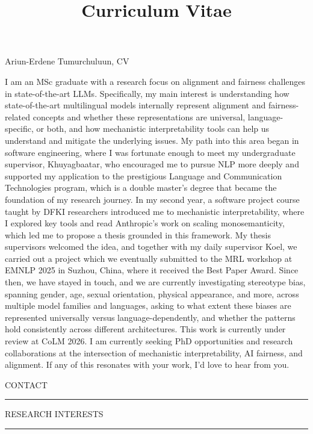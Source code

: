 \documentclass[11pt,a4paper,roman]{moderncv}
\title{Curriculum Vitae}
\newcommand{\cvsection}[1]{%
  \vspace{0.8em}%
  {\large\MakeUppercase{#1}}\\[-0.35em]%
  \rule{\textwidth}{0.4pt}\vspace{0.25em}%
}
\begin{document}
\begin{center}
{\Huge{Ariun-Erdene Tumurchuluun, CV}}
\end{center}

I am an MSc graduate with a research focus on alignment and fairness challenges in state-of-the-art LLMs. Specifically, my main interest is understanding how state-of-the-art multilingual models internally represent alignment and fairness-related concepts and whether these representations are universal, language-specific, or both, and how mechanistic interpretability tools can help us understand and mitigate the underlying issues.
My path into this area began in software engineering, where I was fortunate enough to meet my undergraduate supervisor, Khuyagbaatar, who encouraged me to pursue NLP more deeply and supported my application to the prestigious Language and Communication Technologies program, which is a double master's degree that became the foundation of my research journey. In my second year, a software project course taught by DFKI researchers introduced me to mechanistic interpretability, where I explored key tools and read Anthropic's work on scaling monosemanticity, which led me to propose a thesis grounded in this framework. My thesis supervisors welcomed the idea, and together with my daily supervisor Koel, we carried out a project which we eventually submitted to the MRL workshop at EMNLP 2025 in Suzhou, China, where it received the Best Paper Award.
Since then, we have stayed in touch, and we are currently investigating stereotype bias, spanning gender, age, sexual orientation, physical appearance, and more, across multiple model families and languages, asking to what extent these biases are represented universally versus language-dependently, and whether the patterns hold consistently across different architectures. This work is currently under review at CoLM 2026.
I am currently seeking PhD opportunities and research collaborations at the intersection of mechanistic interpretability, AI fairness, and alignment. If any of this resonates with your work, I'd love to hear from you.

\cvsection{Contact}

\cvsection{Research interests}
\end{document}
